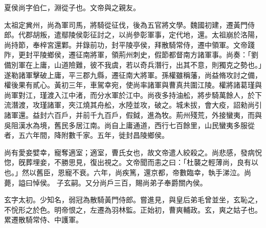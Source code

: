 \begin{pinyinscope}
 
 
 夏侯尚字伯仁，淵從子也。文帝與之親友。
 
 
 太祖定兾州，尚為軍司馬，將騎從征伐，後為五官將文學。魏國初建，遷黃門侍郎。代郡胡叛，遣鄢陵侯彰征討之，以尚參彰軍事，定代地，還。太祖崩於洛陽，尚持節，奉梓宮還鄴。并錄前功，封平陵亭侯，拜散騎常侍，遷中領軍。文帝踐阼，更封平陵鄉侯，遷征南將軍，領荊州刺史，假節都督南方諸軍事。尚奏：「劉備別軍在上庸，山道險難，彼不我虞，若以奇兵潛行，出其不意，則獨克之勢也。」遂勒諸軍擊破上庸，平三郡九縣，遷征南大將軍。孫權雖稱藩，尚益脩攻討之備，權後果有貳心。黃初三年，車駕幸宛，使尚率諸軍與曹真共圍江陵。權將諸葛瑾與尚軍對江，瑾渡入江中渚，而分水軍於江中。尚夜多持油舩，將步騎萬餘人，於下流潛渡，攻瑾諸軍，夾江燒其舟舩，水陸並攻，破之。城未拔，會大疫，詔勑尚引諸軍還。益封六百戶，并前千九百戶，假鉞，進為牧。荊州殘荒，外接蠻夷，而與吳阻漢水為境，舊民多居江南。尚自上庸通道，西行七百餘里，山民蠻夷多服從者，五六年間，降附數千家。五年，徙封昌陵鄉侯。
 
 
尚有愛妾嬖幸，寵奪適室；適室，曹氏女也，故文帝遣人絞殺之。尚悲感，發病怳惚，旣葬埋妾，不勝思見，復出視之。文帝聞而恚之曰：「杜襲之輕薄尚，良有以也。」然以舊臣，恩寵不衰。六年，尚疾篤，還京都，帝數臨幸，執手涕泣。尚薨，謚曰悼侯。
 子玄嗣。又分尚戶三百，賜尚弟子奉爵關內侯。
 
 
玄字太初。少知名，弱冠為散騎黃門侍郎。嘗進見，與皇后弟毛曾並坐，玄恥之，不恱形之於色。明帝恨之，左遷為羽林監。正始初，曹爽輔政。玄，爽之姑子也。累遷散騎常侍、中護軍。
 
 
 

\end{pinyinscope}
